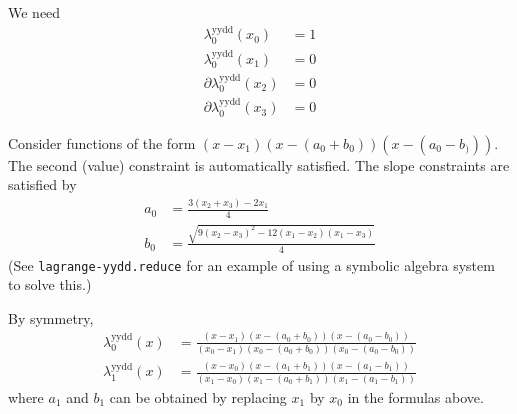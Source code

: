 \label{sec:lagrange-yydd}

We need 
\begin{align}
\lambda^{\text{yydd}}_0(x_0) & = 1 \\ 
\lambda^{\text{yydd}}_0(x_1) & = 0 \nonumber \\
\partial\lambda^{\text{yydd}}_0(x_2) & = 0 \nonumber \\
\partial\lambda^{\text{yydd}}_0(x_3) & = 0 \nonumber 
\end{align}

Consider functions of the form $(x-x_1)(x-(a_0+b_0))(x-(a_0-b_)))$.
The second (value) constraint is automatically satisfied.
The slope constraints are satisfied by
\begin{align}
a_0 & = \frac{3 (x_2 + x_3) - 2 x_1}{4} \\ 
b_0 & = \frac{
\sqrt{ 9 (x_2 - x_3)^2 - 12 (x_1 - x_2) (x_1 -x_3)}
}
{4} \nonumber
\end{align}
(See \texttt{lagrange-yydd.reduce} for an example of using a
symbolic algebra system to solve this.)

By symmetry,  
\begin{align}
\lambda^{\text{yydd}}_0(x) & =
\frac{(x-x_1)(x-(a_0+b_0))(x-(a_0-b_0))}
{(x_0-x_1)(x_0-(a_0+b_0))(x_0-(a_0-b_0))}
\\
\lambda^{\text{yydd}}_1(x) & =
\frac{(x-x_0)(x-(a_1+b_1))(x-(a_1-b_1))}
{(x_1-x_0)(x_1-(a_0+b_1))(x_1-(a_1-b_1))}
\nonumber
\end{align}
where $a_1$ and $b_1$ can be obtained 
by replacing $x_1$ by $x_0$ in the formulas
above.


